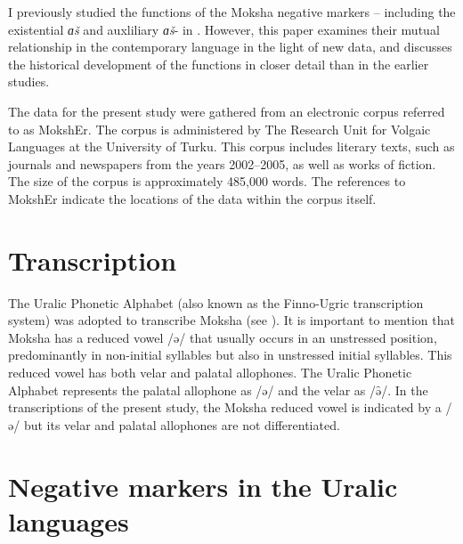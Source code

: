 \documentclass[output=paper,colorlinks,citecolor=brown,draft,draftmode]{langscibook}
\begin{document}
I previously studied the functions of the Moksha negative markers --
including the existential \textit{ɑš} and auxliliary \textit{ɑš}- in \textcites{Hamari2007}{Hamari2013}. However, this paper examines their mutual relationship in the contemporary language in the light of new data, and discusses the historical development of the functions in closer detail than in the earlier studies.

  The data for the present study were gathered from an electronic corpus referred to as MokshEr. The corpus is administered by The Research Unit for Volgaic Languages at the University of Turku. This corpus includes literary texts, such as journals and newspapers from the years 2002--2005, as well as works of fiction. The size of the corpus is approximately 485,000 words. The references to MokshEr indicate the locations of the data within the corpus itself.

\section{Transcription}\label{sec:2:2}

The Uralic Phonetic Alphabet (also known as the Finno-Ugric transcription system) was adopted to transcribe Moksha (see \citealt{SovijarviPeltola1977}). It is important to mention that Moksha has a reduced vowel /ə/ that usually occurs in an unstressed position, predominantly in non-initial syllables but also in unstressed initial syllables. This reduced vowel has both velar and palatal allophones. The Uralic Phonetic Alphabet represents the palatal allophone as /ə/ and the velar as /ǝ̑/. In the transcriptions of the present study, the Moksha reduced vowel is indicated by a /ə/ but its velar and palatal allophones are not differentiated.

\section{Negative markers in the Uralic languages}\label{sec:2:3}
\end{document}

